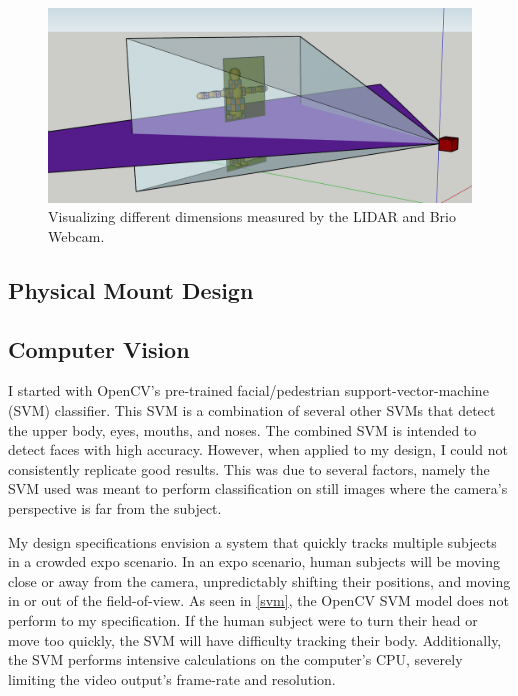 \documentclass[onecolumn, draftclsnofoot,10pt, compsoc]{IEEEtran}
\makeatletter
\newcommand\captionof[1]{\def\@captype{#1}\caption}
\makeatother
\begin{document}
\begin{singlespace}
		\begin{figure}[H]
			\includegraphics[scale=0.5]{different_dimensions.PNG}
			\captionof{figure}{Visualizing different dimensions measured by the LIDAR and Brio Webcam.}
			\label{dimensions}
		\end{figure}

		\subsection{Physical Mount Design}

		\subsection{Computer Vision}
			I started with OpenCV's pre-trained facial/pedestrian support-vector-machine (SVM) classifier.
			This SVM is a combination of several other SVMs that detect the upper body, eyes, mouths, and noses.
			The combined SVM is intended to detect faces with high accuracy.
			However, when applied to my design, I could not consistently replicate good results.
			This was due to several factors, namely the SVM used was meant to perform classification on still images where the camera's perspective is far from the subject.
			

			My design specifications envision a system that quickly tracks multiple subjects in a crowded expo scenario.
			In an expo scenario, human subjects will be moving close or away from the camera, unpredictably shifting their positions, and moving in or out of the field-of-view.
			As seen in \ref{svm}, the OpenCV SVM model does not perform to my specification.
			If the human subject were to turn their head or move too quickly, the SVM will have difficulty tracking their body.
			Additionally, the SVM performs intensive calculations on the computer's CPU, severely limiting the video output's frame-rate and resolution.
			


\end{singlespace}
\end{document}
